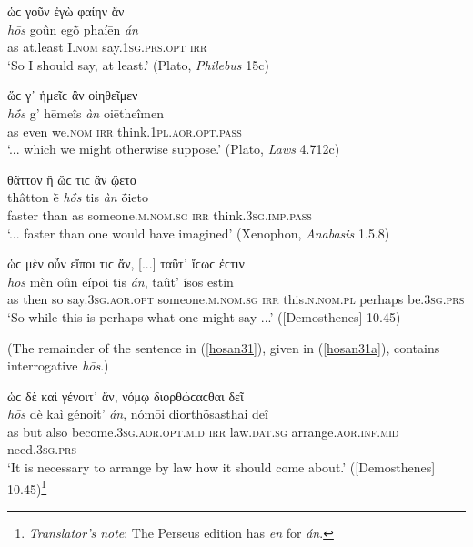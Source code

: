 \begin{exe}
\ex ὡϲ γοῦν ἐγὼ φαίην ἄν\\
\gll \emph{hōs} goûn egṑ phaíēn \emph{án}\\
as at.least I.\textsc{nom} say.\textsc{1sg.prs.opt} \textsc{irr}\\
\trans `So I should say, at least.' (Plato, \textit{Philebus} 15c)
\label{hosan28}
\end{exe}

\begin{exe}
\ex ὥϲ γ᾽ ἡμεῖϲ ἂν οἰηθεῖμεν\\
\gll \emph{hṓs} g' hēmeîs \emph{àn} oiētheîmen\\
as even we.\textsc{nom} \textsc{irr} think.\textsc{1pl.aor.opt.pass}\\
\trans `... which we might otherwise suppose.' (Plato, \textit{Laws} 4.712c)
\label{hosan29}
\end{exe}

\begin{exe}
\ex θᾶττον ἢ ὥϲ τιϲ ἂν ᾤετο\\
\gll thâtton ḕ \emph{hṓs} tis \emph{àn} ṓieto\\
faster than as someone.\textsc{m.nom.sg} \textsc{irr} think.\textsc{3sg.imp.pass}\\
\trans `... faster than one would have imagined' (Xenophon, \textit{Anabasis} 1.5.8)
\label{hosan30}
\end{exe}

\begin{exe}
\ex ὡϲ μὲν οὖν εἴποι τιϲ ἄν, {[}...{]} ταῦτ᾽ ἴϲωϲ ἐϲτιν\\
\gll \emph{hōs} mèn oûn eípoi tis \emph{án}, taût' ísōs estin\\
as then so say.\textsc{3sg.aor.opt} someone.\textsc{m.nom.sg} \textsc{irr} this.\textsc{n.nom.pl} perhaps be.\textsc{3sg.prs}\\
\trans `So while this is perhaps what one might say ...' ({[}Demosthenes{]} 10.45)
\label{hosan31}
\end{exe}

(The remainder of the sentence in (\ref{hosan31}), given in (\ref{hosan31a}), contains interrogative \emph{hōs}.)

\begin{exe}
\ex ὡϲ δὲ καὶ γένοιτ᾽ ἄν, νόμῳ διορθώϲαϲθαι δεῖ\\
\gll \emph{hōs} dè kaì génoit' \emph{án}, nómōi diorthṓsasthai deî\\
as but also become.\textsc{3sg.aor.opt.mid} \textsc{irr} law.\textsc{dat.sg} arrange.\textsc{aor.inf.mid} need.\textsc{3sg.prs}\\
\trans `It is necessary to arrange by law how it should come about.' ({[}Demosthenes{]} 10.45)\footnote{\emph{Translator's note}: The Perseus edition has \textit{en} for \textit{án}.}
\label{hosan31a}
\end{exe}

